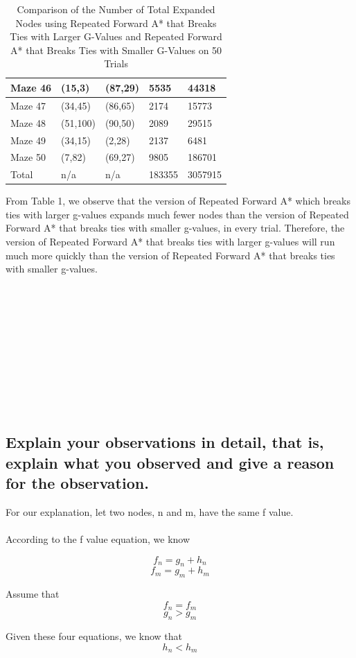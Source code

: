\documentclass{article}
\begin{document}
\begin{table}
{\begin{tabular}{||p{1.5cm}|p{1.5cm}|p{1.5cm}|p{3.5cm}|p{3.5cm}||}
 \hline
 Maze 46 & (15,3) & (87,29) & 5535 & 44318 \\
 \hline
 Maze 47 &  (34,45) & (86,65)& 2174 & 15773\\ 
 \hline
 Maze 48 & (51,100) & (90,50)  & 2089 & 29515\\
 \hline
 Maze 49 & (34,15) & (2,28) & 2137 & 6481\\
 \hline
 Maze 50 & (7,82) & (69,27) & 9805 & 186701\\
\hline
Total & n/a & n/a & 183355 & 3057915
\\[.3ex]
 \hline
\end{tabular}}
\caption{Comparison of the Number of Total Expanded Nodes using Repeated Forward A* that Breaks Ties with Larger G-Values and Repeated Forward A* that Breaks Ties with Smaller G-Values on 50 Trials } 
\end{table} 

From Table 1, we observe that the version of Repeated Forward A* which breaks ties with larger g-values expands much fewer nodes than the version of Repeated Forward A* that breaks ties with smaller g-values, in every trial. Therefore, the version of Repeated Forward A* that breaks ties with larger g-values will run much more quickly than the version of Repeated Forward A* that breaks ties with smaller g-values.\\\\\\\\\\\\\\\\\\\\\\

\subsection{Explain your observations in detail, that is, explain what you observed and give a reason for the observation.}

For our explanation, let two nodes, n and m, have the same f value.\\\\
According to the f value equation, we know

\[f_n = g_n + h_n \]
\[f_m = g_m + h_m \]

Assume that
\[f_n = f_m \]
\[g_n > g_m \]

Given these four equations, we know that
\[h_n<h_m\]
\end{document}
